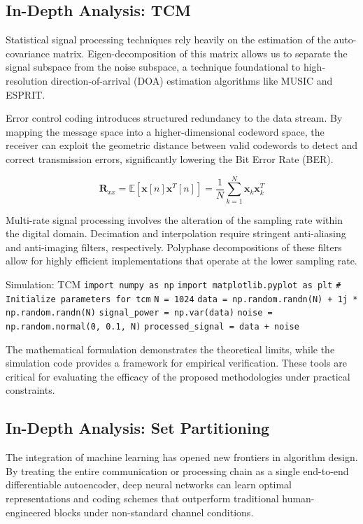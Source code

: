 \subsection{In-Depth Analysis: TCM}
Statistical signal processing techniques rely heavily on the estimation of the auto-covariance matrix. Eigen-decomposition of this matrix allows us to separate the signal subspace from the noise subspace, a technique foundational to high-resolution direction-of-arrival (DOA) estimation algorithms like MUSIC and ESPRIT.

Error control coding introduces structured redundancy to the data stream. By mapping the message space into a higher-dimensional codeword space, the receiver can exploit the geometric distance between valid codewords to detect and correct transmission errors, significantly lowering the Bit Error Rate (BER).

\begin{equation}
    \mathbf{R}_{xx} = \mathbb{E}[\mathbf{x}[n]\mathbf{x}^T[n]] = \frac{1}{N} \sum_{k=1}^{N} \mathbf{x}_k \mathbf{x}_k^T
\end{equation}

Multi-rate signal processing involves the alteration of the sampling rate within the digital domain. Decimation and interpolation require stringent anti-aliasing and anti-imaging filters, respectively. Polyphase decompositions of these filters allow for highly efficient implementations that operate at the lower sampling rate.

\begin{pythonbox}{Simulation: TCM}
\texttt{import numpy as np}
\texttt{import matplotlib.pyplot as plt}
\texttt{}
\texttt{\# Initialize parameters for tcm}
\texttt{N = 1024}
\texttt{data = np.random.randn(N) + 1j * np.random.randn(N)}
\texttt{signal\_power = np.var(data)}
\texttt{noise = np.random.normal(0, 0.1, N)}
\texttt{processed\_signal = data + noise}
\end{pythonbox}

\vspace{0.5cm}
The mathematical formulation demonstrates the theoretical limits, while the simulation code provides a framework for empirical verification. These tools are critical for evaluating the efficacy of the proposed methodologies under practical constraints.


\subsection{In-Depth Analysis: Set Partitioning}
The integration of machine learning has opened new frontiers in algorithm design. By treating the entire communication or processing chain as a single end-to-end differentiable autoencoder, deep neural networks can learn optimal representations and coding schemes that outperform traditional human-engineered blocks under non-standard channel conditions.

